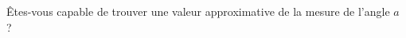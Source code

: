 
\begin{exercice}\label{exo2smath-0256}

    Êtes-vous capable de trouver une valeur approximative de la mesure de l'angle \( a\) ?

\begin{center}
    
\end{center}

\end{exercice}
